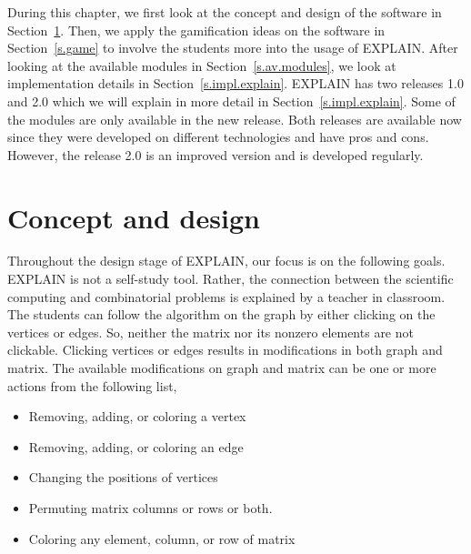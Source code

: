 \documentclass[12pt, twoside,a4paper,toc=bibliography]{scrbook}
\newcommand{\secref}[1]{Section~\protect\ref{#1}}
\begin{document}
During this chapter, we first look at the concept and design of the software in
\secref{s.concept}. Then, we apply the gamification ideas on the software in
\secref{s.game} to involve the students more into the usage of \mbox{EXPLAIN}.
After looking at the available modules in \secref{s.av.modules}, we look at
implementation details in \secref{s.impl.explain}.
\mbox{EXPLAIN} has two releases 1.0 and 2.0 which we will explain in more
detail in \secref{s.impl.explain}. Some of the modules
are only available in the new release. Both releases
are available now since they were developed on different technologies and have
pros and cons. However, the release 2.0 is an improved version and is developed
regularly.
\section{Concept and design}
\label{s.concept}
Throughout the design stage of \mbox{EXPLAIN}, our focus is on the following goals.
\mbox{EXPLAIN} is not a self-study tool.
Rather, the connection between the scientific computing
and combinatorial problems is explained by a teacher in classroom.
The students can follow the algorithm on the graph by either
clicking on the vertices or edges.
So, neither the matrix nor its nonzero elements are not clickable.
Clicking vertices or edges results in modifications in both graph and matrix.
The available modifications on graph and matrix can be one or more actions
from the following list,
\begin{itemize}
\item Removing, adding, or coloring a vertex
\item Removing, adding, or coloring an edge
\item Changing the positions of vertices
\item Permuting matrix columns or rows or both.
\item Coloring any element, column, or row of matrix
\end{itemize}
\end{document}

